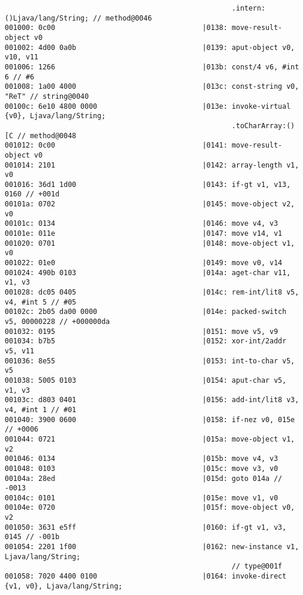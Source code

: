 \begin{lstlisting}
                                                      .intern:()Ljava/lang/String; // method@0046
001000: 0c00                                   |0138: move-result-object v0
001002: 4d00 0a0b                              |0139: aput-object v0, v10, v11
001006: 1266                                   |013b: const/4 v6, #int 6 // #6
001008: 1a00 4000                              |013c: const-string v0, "ReT" // string@0040
00100c: 6e10 4800 0000                         |013e: invoke-virtual {v0}, Ljava/lang/String;
                                                      .toCharArray:()[C // method@0048
001012: 0c00                                   |0141: move-result-object v0
001014: 2101                                   |0142: array-length v1, v0
001016: 36d1 1d00                              |0143: if-gt v1, v13, 0160 // +001d
00101a: 0702                                   |0145: move-object v2, v0
00101c: 0134                                   |0146: move v4, v3
00101e: 011e                                   |0147: move v14, v1
001020: 0701                                   |0148: move-object v1, v0
001022: 01e0                                   |0149: move v0, v14
001024: 490b 0103                              |014a: aget-char v11, v1, v3
001028: dc05 0405                              |014c: rem-int/lit8 v5, v4, #int 5 // #05
00102c: 2b05 da00 0000                         |014e: packed-switch v5, 00000228 // +000000da
001032: 0195                                   |0151: move v5, v9
001034: b7b5                                   |0152: xor-int/2addr v5, v11
001036: 8e55                                   |0153: int-to-char v5, v5
001038: 5005 0103                              |0154: aput-char v5, v1, v3
00103c: d803 0401                              |0156: add-int/lit8 v3, v4, #int 1 // #01
001040: 3900 0600                              |0158: if-nez v0, 015e // +0006
001044: 0721                                   |015a: move-object v1, v2
001046: 0134                                   |015b: move v4, v3
001048: 0103                                   |015c: move v3, v0
00104a: 28ed                                   |015d: goto 014a // -0013
00104c: 0101                                   |015e: move v1, v0
00104e: 0720                                   |015f: move-object v0, v2
001050: 3631 e5ff                              |0160: if-gt v1, v3, 0145 // -001b
001054: 2201 1f00                              |0162: new-instance v1, Ljava/lang/String;
                                                      // type@001f
001058: 7020 4400 0100                         |0164: invoke-direct {v1, v0}, Ljava/lang/String;

\end{lstlisting}
